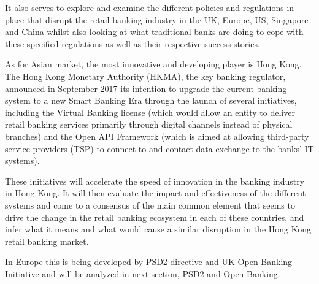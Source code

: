 It also serves to explore and examine the different policies and regulations in place that disrupt the retail banking industry in the UK, Europe, US, Singapore and China whilst also looking at what traditional banks are doing to cope 
with these specified regulations as well as their respective success stories. 

As for Asian market, the most innovative and developing player is Hong Kong.
The Hong Kong Monetary Authority (HKMA), the key banking regulator, announced in September 2017 its intention to upgrade the current banking system to a new Smart Banking Era through the launch of several initiatives, including the Virtual Banking license (which would allow an entity to deliver retail banking services 
primarily through digital channels instead of physical branches)
and the Open API Framework (which is aimed at allowing third-party service providers (TSP) to connect to and contact data exchange to the banks’ IT systems).

These initiatives will accelerate the speed of innovation in the banking industry in Hong Kong. 
It will then evaluate the impact and effectiveness of the different systems 
and come to a consensus of the main common element that seems 
to drive the change in the retail banking ecosystem in each of these countries, 
and infer what it means and what would cause a similar disruption in the Hong Kong retail banking market.
\cite{wavestone_virtual_banking}

In Europe this is being developed by PSD2 directive and UK Open Banking Initiative and will be analyzed in next section, \hyperref[sec:psd2]{PSD2 and Open Banking}.
